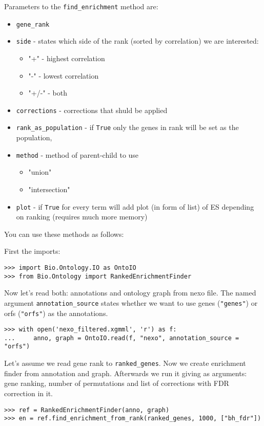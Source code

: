 Parameters to the \verb|find_enrichment| method are:
\begin{itemize}
\item \verb|gene_rank|
\item \verb|side| - states which side of the rank (sorted by correlation)
we are interested:
\begin{itemize}
\item "+" - highest correlation
\item "-" - lowest correlation
\item "+/-" - both
\end{itemize}
\item \verb|corrections| - corrections that shuld be applied
\item \verb|rank_as_population| - if \verb|True| only the  genes in rank 
will be set as the population,
\item \verb|method| - method of parent-child to use
\begin{itemize}
\item "union"
\item "intersection"
\end{itemize}
\item \verb|plot| - if \verb|True| for every term will add plot (in form of list) 
		of ES depending on ranking (requires much more memory)
\end{itemize}

You can use these methods as follows:

First the imports:
\begin{verbatim}
>>> import Bio.Ontology.IO as OntoIO
>>> from Bio.Ontology import RankedEnrichmentFinder
\end{verbatim}

Now let's read both: annotations and ontology graph from nexo file. The named
argument \verb|annotation_source| states whether we want to use genes (\verb|"genes"|)
or orfs (\verb|"orfs"|) as the annotations.

\begin{verbatim}
>>> with open('nexo_filtered.xgmml', 'r') as f:
...     anno, graph = OntoIO.read(f, "nexo", annotation_source = "orfs")
\end{verbatim}

Let's assume we read gene rank to \verb|ranked_genes|.
Now we create enrichment finder from annotation and graph. Afterwards we run it
giving as arguments: gene ranking, number of permutations and list of corrections with
FDR correction in it.
\begin{verbatim}
>>> ref = RankedEnrichmentFinder(anno, graph)
>>> en = ref.find_enrichment_from_rank(ranked_genes, 1000, ["bh_fdr"])
\end{verbatim}

